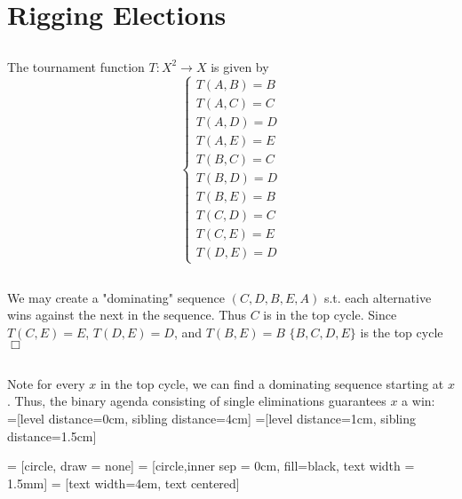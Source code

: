 \documentclass{article}
\begin{document}
\section{Rigging Elections}
\subsection{}
The tournament function $T: X^2 \rightarrow X$ is given by
\begin{equation*}
    \begin{cases}
    T(A,B) = B\\
    T(A,C) = C\\
    T(A,D) = D\\
    T(A,E) = E\\
    T(B,C) = C\\
    T(B,D) = D\\
    T(B,E) = B\\
    T(C,D) = C\\
    T(C,E) = E\\
    T(D,E) = D
    \end{cases}
\end{equation*}

\subsection{}
We may create a "dominating" sequence $(C,D,B,E,A)$ s.t. each alternative wins against the next in the sequence. Thus $C$ is in the top cycle. Since $T(C,E) = E$, $T(D,E) = D$, and $T(B,E) = B$ $\{B,C,D,E\}$ is the top cycle $\Box$

\subsection{}
Note for every $x$ in the top cycle, we can find a dominating sequence starting at $x$. Thus, the binary agenda consisting of single eliminations guarantees $x$ a win:\\

=[level distance=0cm, sibling distance=4cm]
=[level distance=1cm, sibling distance=1.5cm]

 = [circle, draw = none]
 = [circle,inner sep = 0cm, fill=black, text width = 1.5mm]
 = [text width=4em, text centered]
\end{document}
